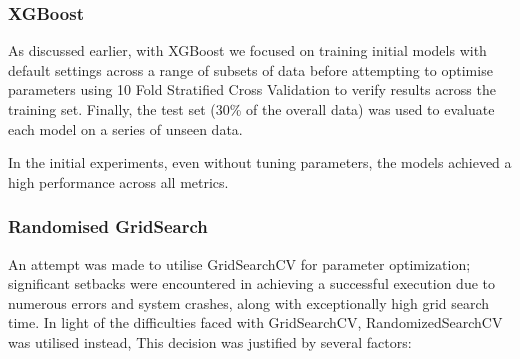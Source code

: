  \newpage

\subsubsection{XGBoost}
\label{sec:xgboost}

As discussed earlier, with XGBoost we focused on training initial models with default settings across a range of subsets of data before attempting to optimise parameters using 10 Fold Stratified Cross Validation to verify results across the training set. Finally, the test set (30\% of the overall data) was used to evaluate each model on a series of unseen data.

In the initial experiments, even without tuning parameters, the models achieved a high performance across all metrics.



\subsubsection*{Randomised GridSearch}

An attempt was made to utilise GridSearchCV for parameter optimization; significant setbacks were encountered in achieving a successful execution due to numerous errors and system crashes, along with exceptionally high grid search time. In light of the difficulties faced with GridSearchCV, RandomizedSearchCV was utilised instead, This decision was justified by several factors:

